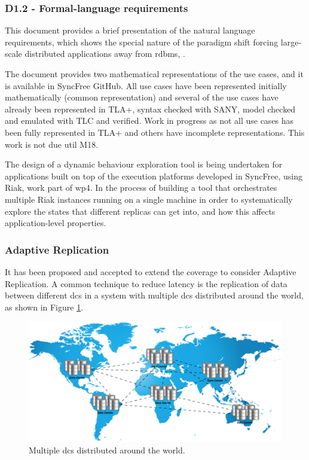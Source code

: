 \documentclass[12pt,twoside]{article}
\begin{document}
\subsubsection{D1.2 - Formal-language requirements}
This document provides a brief presentation of the natural language requirements, which shows the special nature of the paradigm shift forcing large-scale distributed applications away from \gls{rdbms}, \cite{Asco2014a}.

The document provides two mathematical representations of the use cases, and it is available in SyncFree GitHub. All use cases have been represented initially mathematically (common representation) and several of the use cases have already been represented in TLA+, syntax checked with SANY, model checked and emulated with TLC and verified. Work in progress as not all use cases has been fully represented in TLA+ and others have incomplete representations. This work is not due util M18.

The design of a dynamic behaviour exploration tool is being undertaken for applications built on top of the execution platforms developed in SyncFree, using Riak, work part of \gls{wp4}. In the process of building a tool that orchestrates multiple Riak instances running on a single machine in order to systematically explore the states that different
replicas can get into, and how this affects application-level properties.


\subsubsection{Adaptive Replication}
It has been proposed and accepted to extend the coverage to consider Adaptive Replication. A common technique to reduce latency is the replication of data between different \glspl{dc} in a system with multiple \glspl{dc} distributed around the world, as shown in Figure \ref{fig:multi-dcs}.
\begin{figure}[ht!]
	\centering
	\includegraphics[width=1\textwidth]{figures/multiDCs.png}
		
	\caption{Multiple \glspl{dc} distributed around the world.}
	\label{fig:multi-dcs}
\end{figure}
\end{document}

